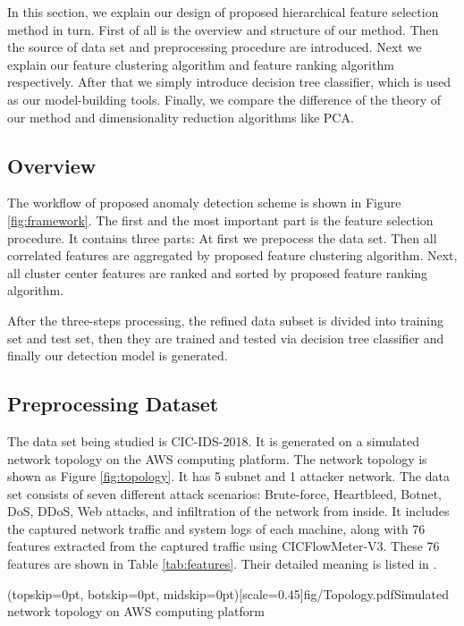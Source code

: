 \documentclass{ieeeaccess}
\theoremstyle{definition}
\begin{document}
In this section, we explain our design of proposed hierarchical feature selection method in turn. First of all is the overview and structure of our method. Then the source of data set and preprocessing procedure are introduced. Next we explain our feature clustering algorithm and feature ranking algorithm respectively. After that we simply introduce decision tree classifier, which is used as our model-building tools. Finally, we compare the difference of the theory of our method and dimensionality reduction algorithms like PCA.

\subsection{Overview}

The workflow of proposed anomaly detection scheme is shown in Figure \ref{fig:framework}.
The first and the most important part is the feature selection procedure. It contains three parts: At first we prepocess the data set. Then all correlated features are aggregated by proposed feature clustering algorithm. Next, all cluster center features are ranked and sorted by proposed feature ranking algorithm.

After the three-steps processing, the refined data subset is divided into training set and test set, then they are trained and tested via decision tree classifier and finally our detection model is generated. 

\subsection{Preprocessing Dataset}

The data set being studied is CIC-IDS-2018\cite{cic2018}.
It is generated on a simulated network topology on the AWS computing platform. The network topology is shown as Figure \ref{fig:topology}. It has 5 subnet and 1 attacker network.
The data set consists of seven different attack scenarios: Brute-force, Heartbleed, Botnet, DoS, DDoS, Web attacks, and infiltration of the network from inside. It includes the captured network traffic and system logs of each machine, along with 76 features extracted from the captured traffic using CICFlowMeter-V3\cite{cicflowmeter}. These 76 features are shown in Table \ref{tab:features}. Their detailed meaning is listed in \cite{cic2018}.

\Figure[!htpb](topskip=0pt, botskip=0pt, midskip=0pt)[scale=0.45]{fig/Topology.pdf}{Simulated network topology on AWS computing platform\label{fig:topology}}
\end{document}
